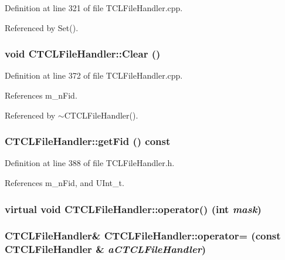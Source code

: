 Definition at line 321 of file TCLFile\-Handler.cpp.

Referenced by Set().
\subsubsection{\setlength{\rightskip}{0pt plus 5cm}void CTCLFile\-Handler::Clear ()}\label{classCTCLFileHandler_a14}




Definition at line 372 of file TCLFile\-Handler.cpp.

References m\_\-n\-Fid.

Referenced by $\sim$CTCLFile\-Handler().
\subsubsection{ CTCLFile\-Handler::get\-Fid () const\hspace{0.3cm}{\tt  [inline]}}\label{classCTCLFileHandler_a10}




Definition at line 388 of file TCLFile\-Handler.h.

References m\_\-n\-Fid, and UInt\_\-t.
\subsubsection{\setlength{\rightskip}{0pt plus 5cm}virtual void CTCLFile\-Handler::operator() (int {\em mask})\hspace{0.3cm}{\tt  [pure virtual]}}\label{classCTCLFileHandler_a12}


\subsubsection{\setlength{\rightskip}{0pt plus 5cm}CTCLFile\-Handler\& CTCLFile\-Handler::operator= (const CTCLFile\-Handler \& {\em a\-CTCLFile\-Handler})\hspace{0.3cm}{\tt  [inline]}}\label{classCTCLFileHandler_a8}




